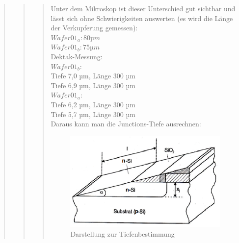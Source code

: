\begin{quote}
\begin{quote}
\begin{quote}
    		\vspace{2em}
    		
    		
			Unter dem Mikroskop ist dieser Unterschied gut sichtbar und lässt 
			sich ohne Schwierigkeiten auswerten (es wird die Länge der 
			Verkupferung gemessen):\\
			$Wafer01_a: 80µm$\\
			$Wafer01_b: 75µm$\\
			
			Dektak-Messung:\\

			$Wafer01_b:$\\

			Tiefe 7,0 µm, Länge 300 µm\\
			Tiefe 6,9 µm, Länge 300 µm\\

			$Wafer01_a$:\\

			Tiefe 6,2 µm, Länge 300 µm\\
			Tiefe 5,7 µm, Länge 300 µm\\
			
			Daraus kann man die Junctions-Tiefe ausrechnen:
			
			\vspace{2em}
    		
    		\begin{figure}[H]
				\hspace{3 cm}
                  \includegraphics[scale=1, trim = 0cm 0cm 0cm 0cm,clip]
                	{./HerstellungBilder/SchematischeDarstellungzumAusrechnenderpnTiefe.png}
                  \caption{Darstellung zur Tiefenbestimmung}
                \label{fig:dartief}
            \end{figure}
            
    		\vspace{2em}
			

\end{quote}
\end{quote}
\end{quote}

